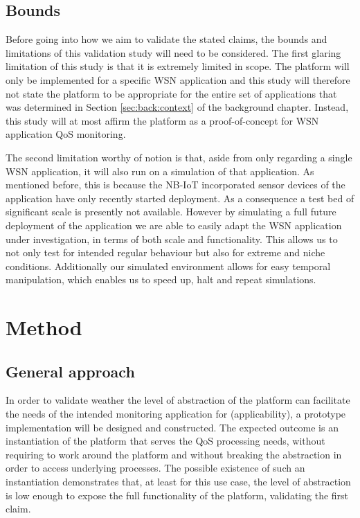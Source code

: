 \subsection{Bounds}
Before going into how we aim to validate the stated claims, the bounds and limitations of this validation study will need to be considered. The first glaring limitation of this study is that it is extremely limited in scope. The platform will only be implemented for a specific WSN application and this study will therefore not state the platform to be appropriate for the entire set of applications that was determined in Section \ref{sec:back:context} of the background chapter. Instead, this study will at most affirm the platform as a proof-of-concept for WSN application QoS monitoring.

The second limitation worthy of notion is that, aside from only regarding a single WSN application, it will also run on a simulation of that application. As mentioned before, this is because the NB-IoT incorporated sensor devices of the \sensit application have only recently started deployment. As a consequence a test bed of significant scale is presently not available. However by simulating a full future deployment of the application we are able to easily adapt the WSN application under investigation, in terms of both scale and functionality. This allows us to not only test for intended regular behaviour but also for extreme and niche conditions. Additionally our simulated environment allows for easy temporal manipulation, which enables us to speed up, halt and repeat simulations.

\section{Method}
\label{sec:val:method}
\subsection{General approach} 
In order to validate weather the level of abstraction of the platform can facilitate the needs of the intended monitoring application for \sensit (applicability), a prototype implementation will be designed and constructed. The expected outcome is an instantiation of the platform that serves the QoS processing needs, without requiring to work around the platform and without breaking the abstraction in order to access underlying processes. The possible existence of such an instantiation demonstrates that, at least for this use case, the level of abstraction is low enough to expose the full functionality of the platform, validating the first claim.

